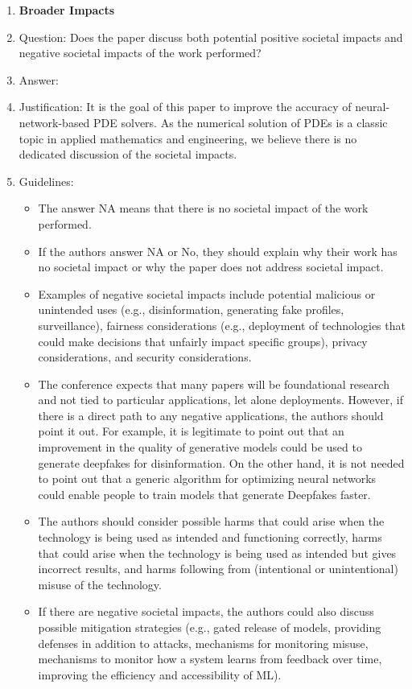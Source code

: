\begin{enumerate}
\item {\bf Broader Impacts}
\item[] Question: Does the paper discuss both potential positive societal impacts and negative societal impacts of the work performed?
\item[] Answer: \answerNo{} %
\item[] Justification: %
It is the goal of this paper to improve the accuracy of neural-network-based PDE solvers. As the numerical solution of PDEs is a classic topic in applied mathematics and engineering, we believe there is no dedicated discussion of the societal impacts. 
\item[] Guidelines:
  \begin{itemize}
  \item The answer NA means that there is no societal impact of the work performed.
  \item If the authors answer NA or No, they should explain why their work has no societal impact or why the paper does not address societal impact.
  \item Examples of negative societal impacts include potential malicious or unintended uses (e.g., disinformation, generating fake profiles, surveillance), fairness considerations (e.g., deployment of technologies that could make decisions that unfairly impact specific groups), privacy considerations, and security considerations.
  \item The conference expects that many papers will be foundational research and not tied to particular applications, let alone deployments. However, if there is a direct path to any negative applications, the authors should point it out. For example, it is legitimate to point out that an improvement in the quality of generative models could be used to generate deepfakes for disinformation. On the other hand, it is not needed to point out that a generic algorithm for optimizing neural networks could enable people to train models that generate Deepfakes faster.
  \item The authors should consider possible harms that could arise when the technology is being used as intended and functioning correctly, harms that could arise when the technology is being used as intended but gives incorrect results, and harms following from (intentional or unintentional) misuse of the technology.
  \item If there are negative societal impacts, the authors could also discuss possible mitigation strategies (e.g., gated release of models, providing defenses in addition to attacks, mechanisms for monitoring misuse, mechanisms to monitor how a system learns from feedback over time, improving the efficiency and accessibility of ML).
  \end{itemize}


\end{enumerate}
